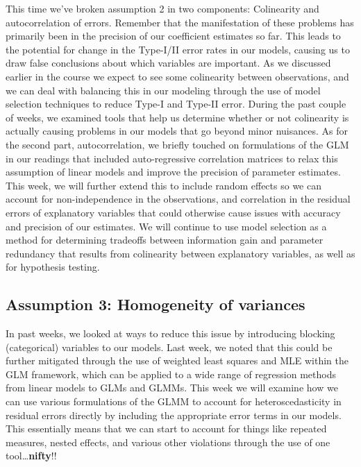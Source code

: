 \documentclass[
]{book}
\begin{document}
This time we've broken assumption 2 in two components: Colinearity and autocorrelation of errors. Remember that the manifestation of these problems has primarily been in the precision of our coefficient estimates so far. This leads to the potential for change in the Type-I/II error rates in our models, causing us to draw false conclusions about which variables are important. As we discussed earlier in the course we expect to see some colinearity between observations, and we can deal with balancing this in our modeling through the use of model selection techniques to reduce Type-I and Type-II error. During the past couple of weeks, we examined tools that help us determine whether or not colinearity is actually causing problems in our models that go beyond minor nuisances. As for the second part, autocorrelation, we briefly touched on formulations of the GLM in our readings that included auto-regressive correlation matrices to relax this assumption of linear models and improve the precision of parameter estimates. This week, we will further extend this to include random effects so we can account for non-independence in the observations, and correlation in the residual errors of explanatory variables that could otherwise cause issues with accuracy and precision of our estimates. We will continue to use model selection as a method for determining tradeoffs between information gain and parameter redundancy that results from colinearity between explanatory variables, as well as for hypothesis testing.

\hypertarget{homogeneity-14}{%
\subsection{Assumption 3: Homogeneity of variances}\label{homogeneity-14}}

In past weeks, we looked at ways to reduce this issue by introducing blocking (categorical) variables to our models. Last week, we noted that this could be further mitigated through the use of weighted least squares and MLE within the GLM framework, which can be applied to a wide range of regression methods from linear models to GLMs and GLMMs. This week we will examine how we can use various formulations of the GLMM to account for heteroscedasticity in residual errors directly by including the appropriate error terms in our models. This essentially means that we can start to account for things like repeated measures, nested effects, and various other violations through the use of one tool\ldots{}\textbf{nifty}!!
\end{document}
